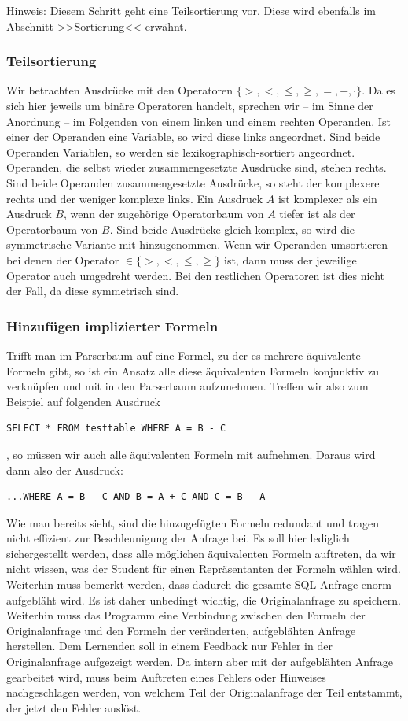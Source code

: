 Hinweis: Diesem Schritt geht eine Teilsortierung vor. Diese wird ebenfalls im Abschnitt >>Sortierung<< erwähnt. 

\subsubsection{Teilsortierung}

Wir betrachten Ausdrücke mit den Operatoren $\{>,<,\leq,\geq,=,+,\cdot\}$. Da es sich hier jeweils um binäre Operatoren handelt, sprechen wir -- im Sinne der Anordnung -- im Folgenden von einem linken und einem rechten Operanden. Ist einer der Operanden eine Variable, so wird diese links angeordnet. Sind beide Operanden Variablen, so werden sie lexikographisch-sortiert angeordnet. Operanden, die selbst wieder zusammengesetzte Ausdrücke sind, stehen rechts. Sind beide Operanden zusammengesetzte Ausdrücke, so steht der komplexere rechts und der weniger komplexe links. Ein Ausdruck $A$ ist komplexer als ein Ausdruck $B$, wenn der zugehörige Operatorbaum von $A$ tiefer ist als der Operatorbaum von $B$. Sind beide Ausdrücke gleich komplex, so wird die symmetrische Variante mit hinzugenommen. Wenn wir Operanden umsortieren bei denen der Operator $\in \{>,<,\leq,\geq\}$ ist, dann muss der jeweilige Operator auch umgedreht werden. Bei den restlichen Operatoren ist dies nicht der Fall, da diese symmetrisch sind.

\subsubsection{Hinzufügen implizierter Formeln}

Trifft man im Parserbaum auf eine Formel, zu der es mehrere äquivalente Formeln gibt, so ist ein Ansatz alle diese äquivalenten Formeln konjunktiv zu verknüpfen und mit in den Parserbaum aufzunehmen. Treffen wir also zum Beispiel auf folgenden Ausdruck \begin{verbatim}SELECT * FROM testtable WHERE A = B - C\end{verbatim}, so müssen wir auch alle äquivalenten Formeln mit aufnehmen. Daraus wird dann also der Ausdruck: \begin{verbatim}...WHERE A = B - C AND B = A + C AND C = B - A\end{verbatim}

Wie man bereits sieht, sind die hinzugefügten Formeln redundant und tragen nicht effizient zur Beschleunigung der Anfrage bei. Es soll hier lediglich sichergestellt werden, dass alle möglichen äquivalenten Formeln auftreten, da wir nicht wissen, was der Student für einen Repräsentanten der Formeln wählen wird. Weiterhin muss bemerkt werden, dass dadurch die gesamte SQL-Anfrage enorm aufgebläht wird. Es ist daher unbedingt wichtig, die Originalanfrage zu speichern. Weiterhin muss das Programm eine Verbindung zwischen den Formeln der Originalanfrage und den Formeln der veränderten, aufgeblähten Anfrage herstellen. Dem Lernenden soll in einem Feedback nur Fehler in der Originalanfrage aufgezeigt werden. Da intern aber mit der aufgeblähten Anfrage gearbeitet wird, muss beim Auftreten eines Fehlers oder Hinweises nachgeschlagen werden, von welchem Teil der Originalanfrage der Teil entstammt, der jetzt den Fehler auslöst.

